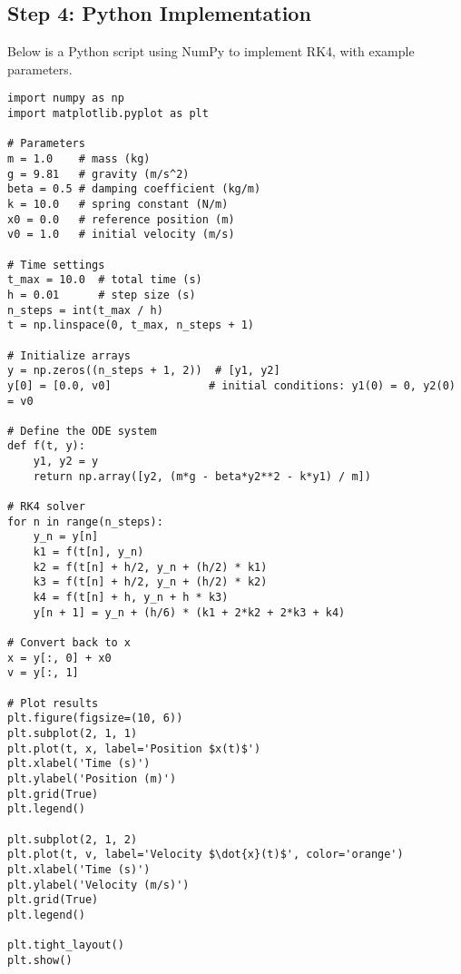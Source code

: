 \documentclass[a4paper,12pt]{article}
\begin{document}
\subsection*{Step 4: Python Implementation}
Below is a Python script using NumPy to implement RK4, with example parameters.

\begin{lstlisting}
import numpy as np
import matplotlib.pyplot as plt

# Parameters
m = 1.0    # mass (kg)
g = 9.81   # gravity (m/s^2)
beta = 0.5 # damping coefficient (kg/m)
k = 10.0   # spring constant (N/m)
x0 = 0.0   # reference position (m)
v0 = 1.0   # initial velocity (m/s)

# Time settings
t_max = 10.0  # total time (s)
h = 0.01      # step size (s)
n_steps = int(t_max / h)
t = np.linspace(0, t_max, n_steps + 1)

# Initialize arrays
y = np.zeros((n_steps + 1, 2))  # [y1, y2]
y[0] = [0.0, v0]               # initial conditions: y1(0) = 0, y2(0) = v0

# Define the ODE system
def f(t, y):
    y1, y2 = y
    return np.array([y2, (m*g - beta*y2**2 - k*y1) / m])

# RK4 solver
for n in range(n_steps):
    y_n = y[n]
    k1 = f(t[n], y_n)
    k2 = f(t[n] + h/2, y_n + (h/2) * k1)
    k3 = f(t[n] + h/2, y_n + (h/2) * k2)
    k4 = f(t[n] + h, y_n + h * k3)
    y[n + 1] = y_n + (h/6) * (k1 + 2*k2 + 2*k3 + k4)

# Convert back to x
x = y[:, 0] + x0
v = y[:, 1]

# Plot results
plt.figure(figsize=(10, 6))
plt.subplot(2, 1, 1)
plt.plot(t, x, label='Position $x(t)$')
plt.xlabel('Time (s)')
plt.ylabel('Position (m)')
plt.grid(True)
plt.legend()

plt.subplot(2, 1, 2)
plt.plot(t, v, label='Velocity $\dot{x}(t)$', color='orange')
plt.xlabel('Time (s)')
plt.ylabel('Velocity (m/s)')
plt.grid(True)
plt.legend()

plt.tight_layout()
plt.show()
\end{lstlisting}

\end{document}
